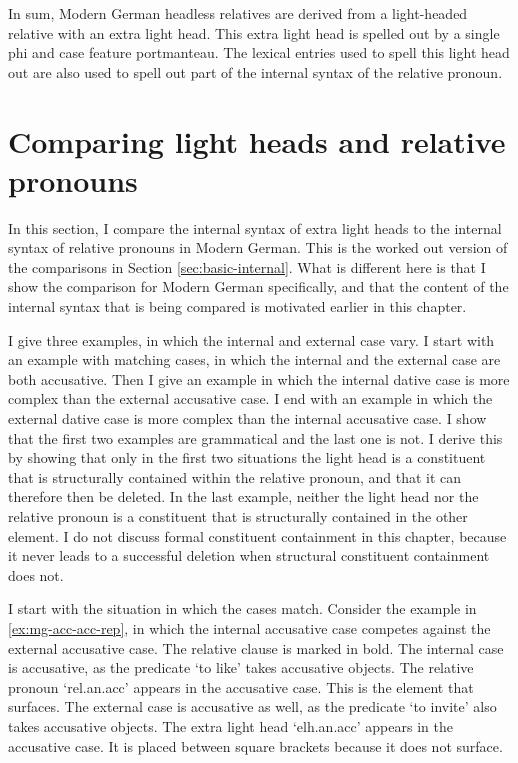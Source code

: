 In sum, Modern German headless relatives are derived from a light-headed relative with an extra light head. This extra light head is spelled out by a single phi and case feature portmanteau. The lexical entries used to spell this light head out are also used to spell out part of the internal syntax of the relative pronoun.



\section{Comparing light heads and relative pronouns}\label{sec:comparing-mg}

In this section, I compare the internal syntax of extra light heads to the internal syntax of relative pronouns in Modern German. This is the worked out version of the comparisons in Section \ref{sec:basic-internal}. What is different here is that I show the comparison for Modern German specifically, and that the content of the internal syntax that is being compared is motivated earlier in this chapter.

I give three examples, in which the internal and external case vary.
I start with an example with matching cases, in which the internal and the external case are both accusative.
Then I give an example in which the internal dative case is more complex than the external accusative case.
I end with an example in which the external dative case is more complex than the internal accusative case.
I show that the first two examples are grammatical and the last one is not. I derive this by showing that only in the first two situations the light head is a constituent that is structurally contained within the relative pronoun, and that it can therefore then be deleted.
In the last example, neither the light head nor the relative pronoun is a constituent that is structurally contained in the other element.
I do not discuss formal constituent containment in this chapter, because it never leads to a successful deletion when structural constituent containment does not.

I start with the situation in which the cases match.
Consider the example in \ref{ex:mg-acc-acc-rep}, in which the internal accusative case competes against the external accusative case. The relative clause is marked in bold.
The internal case is accusative, as the predicate  `to like' takes accusative objects. The relative pronoun  `\ac{rel}.\ac{an}.\ac{acc}' appears in the accusative case. This is the element that surfaces.
The external case is accusative as well, as the predicate  `to invite' also takes accusative objects. The extra light head  `\ac{elh}.\ac{an}.\ac{acc}' appears in the accusative case. It is placed between square brackets because it does not surface.

